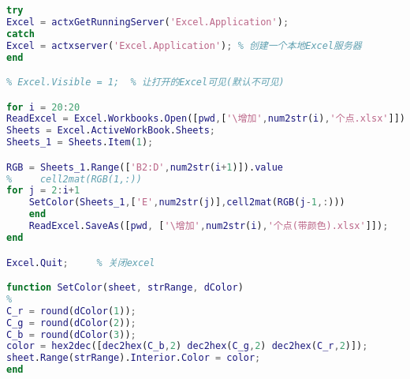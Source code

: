 \begin{lstlisting}[language=matlab]
try
Excel = actxGetRunningServer('Excel.Application');
catch
Excel = actxserver('Excel.Application'); % 创建一个本地Excel服务器
end

% Excel.Visible = 1;  % 让打开的Excel可见(默认不可见)

for i = 20:20
ReadExcel = Excel.Workbooks.Open([pwd,['\增加',num2str(i),'个点.xlsx']]);
Sheets = Excel.ActiveWorkBook.Sheets;
Sheets_1 = Sheets.Item(1);

RGB = Sheets_1.Range(['B2:D',num2str(i+1)]).value
%     cell2mat(RGB(1,:))
for j = 2:i+1
	SetColor(Sheets_1,['E',num2str(j)],cell2mat(RGB(j-1,:)))
	end
	ReadExcel.SaveAs([pwd, ['\增加',num2str(i),'个点(带颜色).xlsx']]);
end

Excel.Quit;     % 关闭excel

function SetColor(sheet, strRange, dColor)
%
C_r = round(dColor(1));
C_g = round(dColor(2));
C_b = round(dColor(3));
color = hex2dec([dec2hex(C_b,2) dec2hex(C_g,2) dec2hex(C_r,2)]);
sheet.Range(strRange).Interior.Color = color;
end
\end{lstlisting}
